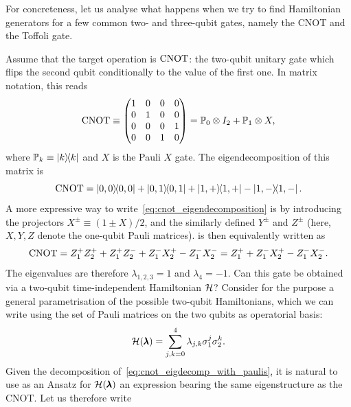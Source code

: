 For concreteness, let us analyse what happens when we try to find Hamiltonian generators for a few common two- and three-qubit gates, namely the CNOT and the Toffoli gate.
\begin{example}[label=ex:eigendecomposition_cnot]
Assume that the target operation is $\operatorname{CNOT}$: the two-qubit unitary gate which flips the second qubit conditionally to the value of the first one.
In matrix notation, this reads
\begin{equation}
    \operatorname{CNOT} \equiv\begin{pmatrix}1&0&0&0 \\ 0&1&0&0 \\ 0&0&0&1\\0&0&1&0\end{pmatrix} =
    \mathbb{P}_0\otimes I_2 + \mathbb{P}_1\otimes X,
\end{equation}
where $\mathbb{P}_k\equiv\ketbra k$ and $X$ is the Pauli $X$ gate.
The eigendecomposition of this matrix is
\begin{equation}
    \operatorname{CNOT} =
    \ketbra{0,0} + \ketbra{0,1} + \ketbra{1,+} - \ketbra{1,-}.
    \label{eq:cnot_eigendecomposition}
\end{equation}
A more expressive way to write~\cref{eq:cnot_eigendecomposition} is by introducing the projectors $X^\pm\equiv(1\pm X)/2$, and the similarly defined $Y^\pm$ and $Z^\pm$ (here, $X,Y,Z$ denote the one-qubit Pauli matrices).
 is then equivalently written as
\begin{equation}
    \operatorname{CNOT} =
    Z^+_1 Z^+_2 + Z^+_1 Z^-_2
    + Z^-_1 X^+_2
    - Z^-_1 X^-_2
    = Z_1^+ + Z_1^- X_2^+ - Z_1^- X_2^-.
    \label{eq:cnot_eigdecomp_with_paulis}
\end{equation}
The eigenvalues are therefore $\lambda_{1,2,3}=1$ and $\lambda_4=-1$.
Can this gate be obtained via a two-qubit time-independent Hamiltonian $\mathcal{H}$?
Consider for the purpose a general parametrisation of the possible two-qubit Hamiltonians, which we can write using the set of Pauli matrices on the two qubits as operatorial basis:
\begin{equation}
    \mathcal{H}({\pmb{\lambda}}) =
    \sum_{j,k=0}^4 \lambda_{j,k} \sigma^j_1\sigma^k_2.
\end{equation}
Given the decomposition of~\cref{eq:cnot_eigdecomp_with_paulis}, it is natural to use as an Ansatz for $\mathcal{H}(\pmb{\lambda})$ an expression bearing the same eigenstructure as the CNOT. Let us therefore write
\begin{equation}

\end{equation}
\end{example}
